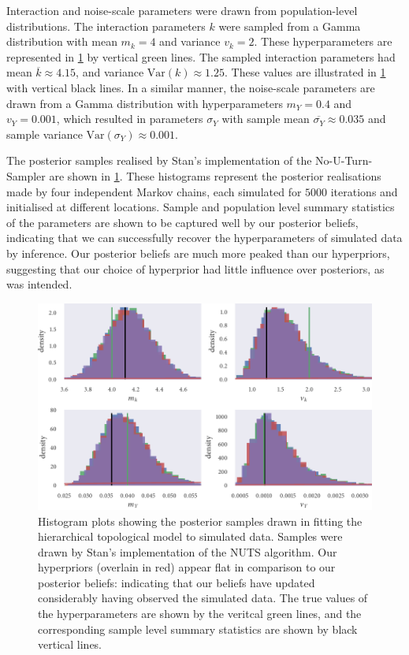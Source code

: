 Interaction and noise-scale parameters were drawn from population-level
distributions. The interaction parameters $k$ were sampled from a Gamma
distribution with mean $m_k=4$ and variance $v_k=2$. These hyperparameters are
represented in \cref{fig:top_hier_hist} by vertical green lines. The sampled
interaction parameters had mean $\overline{k}\approx4.15$, and variance
$\text{Var}(k)\approx1.25$. These values are illustrated in
\cref{fig:top_hier_hist} with vertical black lines. In a similar manner, the
noise-scale parameters are drawn from a Gamma distribution with hyperparameters
$m_Y=0.4$ and $v_Y=0.001$, which resulted in parameters $\sigma_Y$ with sample
mean $\overline{\sigma_Y}\approx0.035$ and sample variance
$\text{Var}(\sigma_Y)\approx0.001$.

The posterior samples realised by Stan's implementation of the
No-U-Turn-Sampler are shown in \cref{fig:top_hier_hist}. These histograms
represent the posterior realisations made by four independent Markov chains,
each simulated for $5000$ iterations and initialised at different locations.
Sample and population level summary statistics of the parameters are shown to
be captured well by our posterior beliefs, indicating that we can successfully
recover the hyperparameters of simulated data by inference. Our posterior
beliefs are much more peaked than our hyperpriors, suggesting that our choice
of hyperprior had little influence over posteriors, as was intended.

\begin{figure}[tbp]
  \includegraphics{top_hier_hist.pdf}
  \caption{Histogram plots showing the posterior samples drawn in fitting the
    hierarchical topological model to simulated data. Samples were drawn by
    Stan's implementation of the NUTS algorithm. Our hyperpriors (overlain in
    red) appear flat in comparison to our posterior beliefs: indicating that
    our beliefs have updated considerably having observed the simulated data.
    The true values of the hyperparameters are shown by the veritcal green
    lines, and the corresponding sample level summary statistics are shown by black
    vertical lines.}
  \label{fig:top_hier_hist}
\end{figure}

